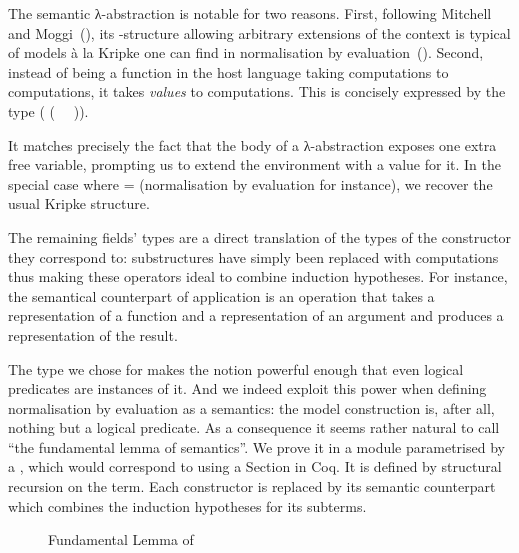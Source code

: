 
The semantic λ-abstraction is notable for two reasons.
%
First, following Mitchell and Moggi~(\citeyear{mitchell1991kripke}),
its -structure allowing arbitrary extensions of the context is typical
of models à la Kripke  one can find in normalisation by
evaluation~(\cite{berger1991inverse,berger1993program,CoqDybSK,coquand2002formalised}).
%
Second, instead of being a function in the host language taking
computations to computations,  it takes \emph{values} to computations.
This is concisely expressed by the type ({ (~  ~)}).

It matches precisely the fact that the body of a λ-abstraction exposes
one extra free variable, prompting us to extend the environment with a
value for it. In the special case where  =  (normalisation
by evaluation for instance), we recover the usual Kripke structure.


The remaining fields' types are a direct translation of the types of the
constructor they correspond to: substructures have simply been replaced with
computations thus making these operators ideal to combine induction hypotheses.
For instance, the semantical counterpart of application is an operation that
takes a representation of a function and a representation of an argument and
produces a representation of the result.


The type we chose for  makes the  notion powerful enough that
even logical predicates are instances of it. And we indeed exploit this power when
defining normalisation by evaluation as a semantics: the model construction is, after
all, nothing but a logical predicate. As a consequence it seems rather natural to call
 ``the fundamental lemma of semantics''. We prove it in a module parametrised
by a , which would correspond to using a Section in Coq. It is defined by
structural recursion on the term. Each constructor is replaced by its semantic counterpart
which combines the induction hypotheses for its subterms.

\begin{figure}[h]
\caption{Fundamental Lemma of \label{fig:fundsem}}
\end{figure}

